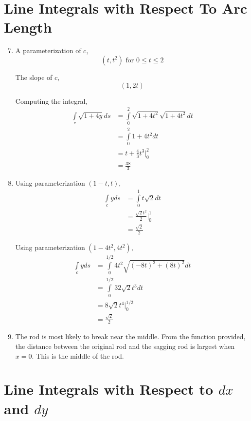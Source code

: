 \documentclass{article}
\begin{document}
\section{Line Integrals with Respect To Arc Length}

\begin{enumerate}[1.]
  \setcounter{enumi}{6}
  \item A parameterization of $c$,
    $$ (t, t^{2}) \textrm{ for } 0 \leq t \leq 2 $$

    The slope of $c$,
    $$ (1, 2t) $$

    Computing the integral,
    \begin{align*}
      \int\limits_{c} \sqrt{1 + 4y} ds &= \int\limits_{0}^{2} \sqrt{1 + 4t^{2}}
      \sqrt{1 + 4t^{2}} dt \\
      &= \int\limits_{0}^{2} 1 + 4t^{2} dt \\
      &= t + \frac{ 4 }{ 3 } t^{3} \bigg\vert_{0}^{2} \\
      &= \frac{38}{3}
    \end{align*}
  \item Using parameterization $(1 - t, t)$,
    \begin{align*}
      \int\limits_{c} y ds &= \int\limits_{0}^{1} t \sqrt{2} dt \\
                           &= \frac{ \sqrt{2} t^{2} }{ 2 } \bigg\vert_{0}^{1} \\
                           &= \frac{ \sqrt{2} }{ 2 }
    \end{align*}

    Using parameterization $(1 - 4t^{2}, 4t^{2})$,
    \begin{align*}
      \int\limits_{c} y ds &= \int\limits_{0}^{1/2} 4t^{2} \sqrt{(-8t)^{2} +
      (8t)^{2}} dt \\
      &= \int\limits_{0}^{1/2} 32 \sqrt{2} t^{3} dt \\
      &= 8 \sqrt{2} t^{4} \bigg\vert_{0}^{1/2} \\
      &= \frac{ \sqrt{2} }{ 2 }
    \end{align*}
  \item The rod is most likely to break near the middle. From the function
    provided, the distance between the original rod and the sagging rod is
    largest when $x = 0$. This is the middle of the rod.
\end{enumerate}

\section{Line Integrals with Respect to $dx$ and $dy$}
\end{document}
